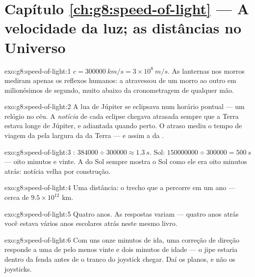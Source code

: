 \section*{Capítulo \ref{ch:g8:speed-of-light} --- A velocidade da luz; as distâncias no Universo}

\begin{solution}{exo:g8:speed-of-light:1}
$c = \qty{300000}{km/s} = 3 \times 10^{8}\ \unit{m/s}$. As lanternas
nos morros mediram apenas os reflexos humanos: a  atravessou de um
morro ao outro em milionésimos de segundo, muito abaixo da
cronometragem de qualquer mão.
\end{solution}

\begin{solution}{exo:g8:speed-of-light:2}
A lua de Júpiter se eclipsava num horário pontual --- um relógio no
céu. A \emph{notícia} de cada eclipse chegava atrasada sempre que a
Terra estava longe de Júpiter, e adiantada quando perto. O atraso
mediu o tempo de viagem da  pela largura da  da Terra --- e
assim a  da .
\end{solution}

\begin{solution}{exo:g8:speed-of-light:3}
: $384000 \div 300000 \approx \qty{1.3}{s}$. Sol:
$150000000 \div 300000 = \qty{500}{s}$ --- oito minutos e vinte. A 
do Sol sempre mostra o Sol como ele era oito minutos atrás: notícia
velha por construção.
\end{solution}

\begin{solution}{exo:g8:speed-of-light:4}
Uma distância: o trecho que a  percorre em um ano --- cerca de
$9.5 \times 10^{12}$ km.
\end{solution}

\begin{solution}{exo:g8:speed-of-light:5}
Quatro anos. As respostas variam --- quatro anos atrás você estava
vários anos escolares atrás neste mesmo livro.
\end{solution}

\begin{solution}{exo:g8:speed-of-light:6}
Com uns onze minutos de ida, uma correção de direção responde a uma
 de pelo menos vinte e dois minutos de idade --- o jipe estaria
dentro da fenda antes de o tranco do joystick chegar. Daí os planos,
e não os joysticks.
\end{solution}


